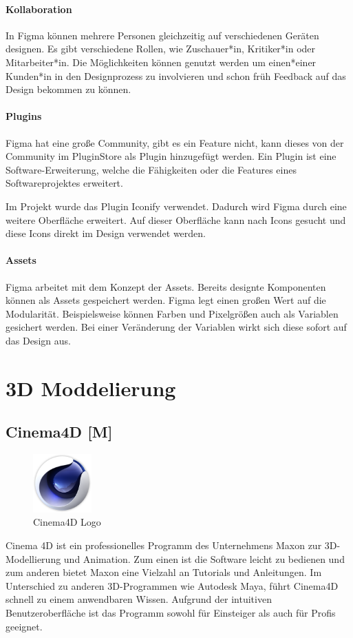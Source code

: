 \paragraph{Kollaboration}
In Figma können mehrere Personen gleichzeitig auf verschiedenen Geräten designen. Es gibt verschiedene Rollen, wie Zuschauer*in, Kritiker*in oder Mitarbeiter*in. Die Möglichkeiten können genutzt werden um einen*einer Kunden*in in den Designprozess zu involvieren und schon früh Feedback auf das Design bekommen zu können.

\paragraph{Plugins}
Figma hat eine große Community, gibt es ein Feature nicht, kann dieses von der Community im PluginStore als Plugin hinzugefügt werden. Ein Plugin ist eine Software-Erweiterung, welche die Fähigkeiten oder die Features eines Softwareprojektes erweitert.

Im Projekt wurde das Plugin Iconify verwendet. Dadurch wird  Figma durch eine weitere Oberfläche erweitert. Auf dieser Oberfläche kann nach Icons gesucht und diese Icons direkt im Design verwendet werden.

\paragraph{Assets}
Figma arbeitet mit dem Konzept der Assets. Bereits designte Komponenten können als Assets gespeichert werden. Figma legt einen großen Wert auf die Modularität. Beispielsweise können Farben und Pixelgrößen auch als Variablen gesichert werden. Bei einer Veränderung der Variablen wirkt sich diese sofort auf das Design aus.

\section{3D Moddelierung}
\subsection{Cinema4D [M]}
\begin{figure}
  \begin{center}
    \includegraphics[width=0.2\textwidth]{pics/cinema4d_logo.png}
   \caption{Cinema4D Logo}
  \end{center}
\end{figure}
Cinema 4D ist ein professionelles Programm des Unternehmens Maxon zur 3D-Modellierung und Animation. Zum einen ist die Software leicht zu bedienen und zum anderen bietet Maxon eine Vielzahl an Tutorials und Anleitungen. Im Unterschied zu anderen 3D-Programmen wie Autodesk Maya, führt Cinema4D schnell zu einem anwendbaren Wissen. Aufgrund der intuitiven Benutzeroberfläche ist das Programm sowohl für Einsteiger als auch für Profis geeignet. \cite{Cinema4D}

